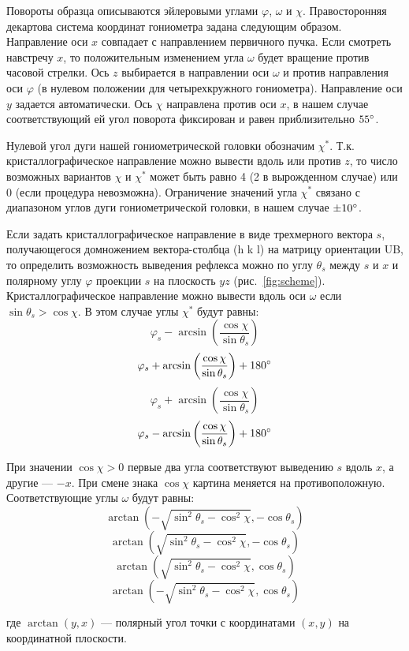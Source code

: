 Повороты образца описываются эйлеровыми углами $\varphi$, $\omega$ и $\chi$.
Правосторонняя декартова система координат гониометра задана следующим образом.
Направление оси $x$ совпадает с направлением первичного пучка.
Если смотреть навстречу $x$, то положительным изменением угла $\omega$ будет вращение против часовой стрелки.
Ось $z$ выбирается в направлении оси $\omega$ и против направления оси $\varphi$ (в нулевом положении для четырехкружного гониометра).
Направление оси $y$ задается автоматически.
Ось $\chi$ направлена против оси $x$, в нашем случае соответствующий ей угол поворота фиксирован и равен приблизительно $55^\circ$.

Нулевой угол дуги нашей гониометрической головки обозначим $\chi^\ast$.
Т.к. кристаллографическое направление можно вывести вдоль или против $z$, то число возможных вариантов $\chi$ и $\chi^\ast$ может быть равно 4 (2 в вырожденном случае) или 0 (если процедура невозможна).
Ограничение значений угла $\chi^\ast$ связано с диапазоном углов дуги гониометрической головки, в нашем случае $\pm 10^\circ$.

Если задать кристаллографическое направление \hkl[h k l] в виде трехмерного вектора $s$, получающегося домножением вектора-столбца \hkl(h k l) на матрицу ориентации UB, то определить возможность выведения рефлекса можно по углу $\theta_s$ между $s$ и $x$ и полярному углу $\varphi$ проекции $s$ на плоскость $yz$ (рис.~\ref{fig:scheme}).
Кристаллографическое направление можно вывести вдоль оси $\omega$ если $\sin{\theta_s} > \cos{\chi}$.
В этом случае углы $\chi^\ast$ будут равны:
\[ \varphi_s - \arcsin\left(\frac{\cos{\chi}}{\sin{\theta_s}}\right) \]
\[ \varphi_s + \arcsin\left(\frac{\cos{\chi}}{\sin{\theta_s}}\right) + 180^\circ \]
\[ \varphi_s + \arcsin\left(\frac{\cos{\chi}}{\sin{\theta_s}}\right) \]
\[ \varphi_s - \arcsin\left(\frac{\cos{\chi}}{\sin{\theta_s}}\right) + 180^\circ \]

При значении $\cos{\chi} > 0$ первые два угла соответствуют выведению $s$ вдоль $x$, а другие --- $-x$. При смене знака $\cos{\chi}$ картина меняется на противоположную.
Соответствующие углы $\omega$ будут равны:
\[\arctan\left(-\sqrt{\sin^2{\theta_s} - \cos^2{\chi}}, -\cos{\theta_s}\right)\]
\[\arctan\left(\sqrt{\sin^2{\theta_s} - \cos^2{\chi}}, -\cos{\theta_s}\right)\]
\[\arctan\left(\sqrt{\sin^2{\theta_s} - \cos^2{\chi}}, \cos{\theta_s}\right)\]
\[\arctan\left(-\sqrt{\sin^2{\theta_s} - \cos^2{\chi}}, \cos{\theta_s}\right)\]

где $\arctan(y, x)$ –-- полярный угол точки с координатами $(x, y)$ на координатной плоскости. 

